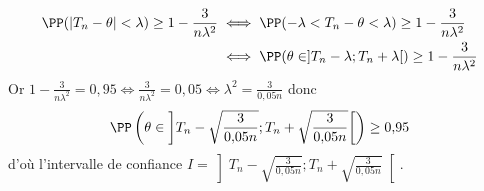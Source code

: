 {\begin{enumerate}
{		\begin{align*}
			\PP(|T_n-\theta| < \lambda) \geq 1-\frac{3}{n\lambda^2} &\iff \PP(-\lambda < T_n-\theta < \lambda ) \geq 1-\frac{3}{n\lambda^2} \\
			&\iff	\PP( \theta \in ]T_n-\lambda ; T_n + \lambda [) \geq 1-\frac{3}{n\lambda^2} 	
		\end{align*} 
		Or 	$1-\frac{3}{n\lambda^2} = 0{,}95 \iff \frac{3}{n\lambda^2} = 0{,}05 \iff \lambda^2 = \frac{3}{0{,}05 n}$
		donc 
		$$\PP\left( \theta \in \left]T_n - \sqrt{\frac{3}{0{,}05 n}} ; T_n + \sqrt{\frac{3}{0{,}05 n}}  \right[\right) \geq 0{,}95$$
		d'où l'intervalle de confiance $I = \left]T_n - \sqrt{\frac{3}{0{,}05 n}} ; T_n + \sqrt{\frac{3}{0{,}05 n}}  \right[$.
	}
\end{enumerate}
}
